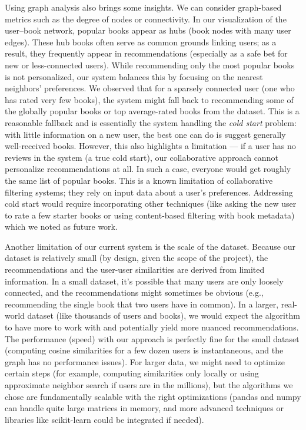 \documentclass[11pt]{article}
\begin{document}
Using graph analysis also brings some insights. We can consider graph-based metrics such as the degree of nodes or connectivity. In our visualization of the user–book network, popular books appear as hubs (book nodes with many user edges). These hub books often serve as common grounds linking users; as a result, they frequently appear in recommendations (especially as a safe bet for new or less-connected users). While recommending only the most popular books is not personalized, our system balances this by focusing on the nearest neighbors’ preferences. We observed that for a sparsely connected user (one who has rated very few books), the system might fall back to recommending some of the globally popular books or top average-rated books from the dataset. This is a reasonable fallback and is essentially the system handling the \textit{cold start} problem: with little information on a new user, the best one can do is suggest generally well-received books. However, this also highlights a limitation — if a user has no reviews in the system (a true cold start), our collaborative approach cannot personalize recommendations at all. In such a case, everyone would get roughly the same list of popular books. This is a known limitation of collaborative filtering systems; they rely on input data about a user’s preferences. Addressing cold start would require incorporating other techniques (like asking the new user to rate a few starter books or using content-based filtering with book metadata) which we noted as future work.

Another limitation of our current system is the scale of the dataset. Because our dataset is relatively small (by design, given the scope of the project), the recommendations and the user-user similarities are derived from limited information. In a small dataset, it’s possible that many users are only loosely connected, and the recommendations might sometimes be obvious (e.g., recommending the single book that two users have in common). In a larger, real-world dataset (like thousands of users and books), we would expect the algorithm to have more to work with and potentially yield more nuanced recommendations. The performance (speed) with our approach is perfectly fine for the small dataset (computing cosine similarities for a few dozen users is instantaneous, and the graph has no performance issues). For larger data, we might need to optimize certain steps (for example, computing similarities only locally or using approximate neighbor search if users are in the millions), but the algorithms we chose are fundamentally scalable with the right optimizations (pandas and numpy can handle quite large matrices in memory, and more advanced techniques or libraries like scikit-learn could be integrated if needed).
\end{document}
